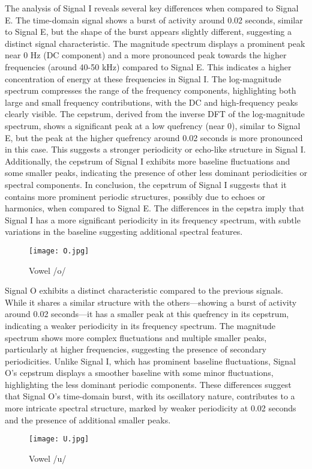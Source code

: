 \documentclass[a4paper,12pt]{article}
\begin{document}
The analysis of Signal I reveals several key differences when compared to Signal E. The time-domain signal shows a burst of activity around 0.02 seconds, similar to Signal E, but the shape of the burst appears slightly different, suggesting a distinct signal characteristic. The magnitude spectrum displays a prominent peak near 0 Hz (DC component) and a more pronounced peak towards the higher frequencies (around 40-50 kHz) compared to Signal E. This indicates a higher concentration of energy at these frequencies in Signal I. The log-magnitude spectrum compresses the range of the frequency components, highlighting both large and small frequency contributions, with the DC and high-frequency peaks clearly visible. The cepstrum, derived from the inverse DFT of the log-magnitude spectrum, shows a significant peak at a low quefrency (near 0), similar to Signal E, but the peak at the higher quefrency around 0.02 seconds is more pronounced in this case. This suggests a stronger periodicity or echo-like structure in Signal I. Additionally, the cepstrum of Signal I exhibits more baseline fluctuations and some smaller peaks, indicating the presence of other less dominant periodicities or spectral components. In conclusion, the cepstrum of Signal I suggests that it contains more prominent periodic structures, possibly due to echoes or harmonics, when compared to Signal E. The differences in the cepstra imply that Signal I has a more significant periodicity in its frequency spectrum, with subtle variations in the baseline suggesting additional spectral features.

\begin{figure}[H]
    \centering
    \texttt{[image: O.jpg]}
    \caption{Vowel /o/}
    \label{fig:O}
\end{figure}
Signal O exhibits a distinct characteristic compared to the previous signals. While it shares a similar structure with the others—showing a burst of activity around 0.02 seconds—it has a smaller peak at this quefrency in its cepstrum, indicating a weaker periodicity in its frequency spectrum. The magnitude spectrum shows more complex fluctuations and multiple smaller peaks, particularly at higher frequencies, suggesting the presence of secondary periodicities. Unlike Signal I, which has prominent baseline fluctuations, Signal O's cepstrum displays a smoother baseline with some minor fluctuations, highlighting the less dominant periodic components. These differences suggest that Signal O’s time-domain burst, with its oscillatory nature, contributes to a more intricate spectral structure, marked by weaker periodicity at 0.02 seconds and the presence of additional smaller peaks.
\begin{figure}[H]
    \centering
    \texttt{[image: U.jpg]}
    \caption{Vowel /u/}
    \label{fig:U}
\end{figure}
\end{document}
